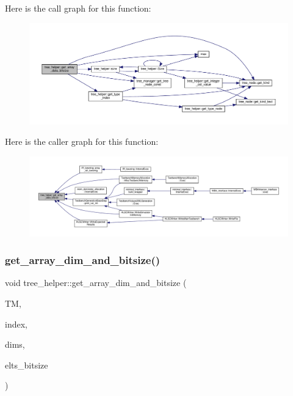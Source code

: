Here is the call graph for this function\+:
\nopagebreak
\begin{figure}[H]
\begin{center}
\leavevmode
\includegraphics[width=350pt]{d7/d99/classtree__helper_a635d8a2cd09d3eb8b3453ee8b608c21a_cgraph}
\end{center}
\end{figure}
Here is the caller graph for this function\+:
\nopagebreak
\begin{figure}[H]
\begin{center}
\leavevmode
\includegraphics[width=350pt]{d7/d99/classtree__helper_a635d8a2cd09d3eb8b3453ee8b608c21a_icgraph}
\end{center}
\end{figure}
\mbox{\label{classtree__helper_a6e4f71d1a6990fa830f5a6c2d2d69513}} 
\subsubsection{\texorpdfstring{get\+\_\+array\+\_\+dim\+\_\+and\+\_\+bitsize()}{get\_array\_dim\_and\_bitsize()}}
{\footnotesize\ttfamily void tree\+\_\+helper\+::get\+\_\+array\+\_\+dim\+\_\+and\+\_\+bitsize (\begin{DoxyParamCaption}\item[{const \hyperlink{tree__manager_8hpp_a792e3f1f892d7d997a8d8a4a12e39346}{tree\+\_\+manager\+Const\+Ref} \&}]{TM,  }\item[{const unsigned int}]{index,  }\item[{std\+::vector$<$ unsigned int $>$ \&}]{dims,  }\item[{unsigned int \&}]{elts\+\_\+bitsize }\end{DoxyParamCaption})\hspace{0.3cm}{\ttfamily [static]}}



